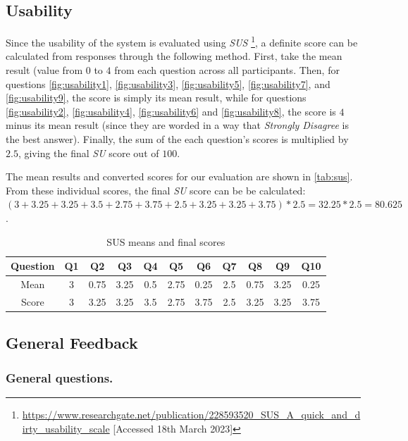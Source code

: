 \documentclass{l4proj}
\begin{document}
\subsection{Usability}
Since the usability of the system is evaluated using \emph{SUS} \footnote{\url{https://www.researchgate.net/publication/228593520_SUS_A_quick_and_dirty_usability_scale} [Accessed 18th March 2023]}, a definite score can be calculated from responses through the following method. First, take the mean result (value from $0$ to $4$ from each question across all participants. Then, for questions \autoref{fig:usability1}, \autoref{fig:usability3}, \autoref{fig:usability5}, \autoref{fig:usability7}, and \autoref{fig:usability9}, the score is simply its mean result, while for questions \autoref{fig:usability2}, \autoref{fig:usability4}, \autoref{fig:usability6} and \autoref{fig:usability8}, the score is $4$ minus its mean result (since they are worded in a way that \emph{Strongly Disagree} is the best answer). Finally, the sum of the each question's scores is multiplied by $2.5$, giving the final \emph{SU} score out of $100$.

The mean results and converted scores for our evaluation are shown in \autoref{tab:sus}. From these individual scores, the final \emph{SU} score can be be calculated: $(3 + 3.25 + 3.25 + 3.5 + 2.75 + 3.75 + 2.5 + 3.25 + 3.25 + 3.75) * 2.5 = 32.25 * 2.5 = 80.625$.

\begin{table}[h]
\begin{center}
\begin{tabular}{| c || c | c | c | c | c | c | c | c | c | c |}
	\hline
	Question & Q1 & Q2 & Q3 & Q4 & Q5 & Q6 & Q7 & Q8 & Q9 & Q10 \\
	\hline
	\hline
	Mean & 3 & 0.75 & 3.25 & 0.5 & 2.75 & 0.25 & 2.5 & 0.75 & 3.25 & 0.25 \\
	\hline
	Score & 3 & 3.25 & 3.25 & 3.5 & 2.75 & 3.75 & 2.5 & 3.25 & 3.25 & 3.75 \\
	\hline
\end{tabular}
\caption{\label{tab:sus}SUS means and final scores}
\end{center}
\end{table}

\subsection{General Feedback}

\subsubsection{General questions.}
\label{sec:personal_questions}
\end{document}

